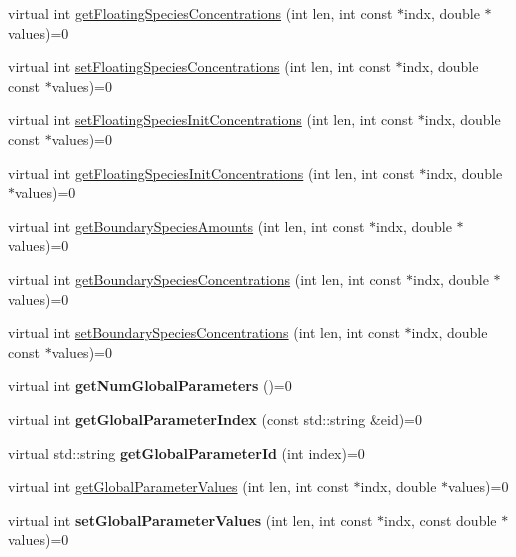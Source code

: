 \begin{DoxyCompactItemize}
\item 
virtual int \hyperlink{classrr_1_1_executable_model_a18aeea833f9db72a6f6beefb0c25f391}{get\-Floating\-Species\-Concentrations} (int len, int const $\ast$indx, double $\ast$values)=0
\item 
virtual int \hyperlink{classrr_1_1_executable_model_a42853a01cc2fae3b4a064d820ebacfaf}{set\-Floating\-Species\-Concentrations} (int len, int const $\ast$indx, double const $\ast$values)=0
\item 
virtual int \hyperlink{classrr_1_1_executable_model_a3a0b495144524d230defee08e58a5150}{set\-Floating\-Species\-Init\-Concentrations} (int len, int const $\ast$indx, double const $\ast$values)=0
\item 
virtual int \hyperlink{classrr_1_1_executable_model_a6521c4bfdb79c0b405a74fc4ccb67309}{get\-Floating\-Species\-Init\-Concentrations} (int len, int const $\ast$indx, double $\ast$values)=0
\item 
virtual int \hyperlink{classrr_1_1_executable_model_a0031c4cc30bf9329fb93f6d99d929669}{get\-Boundary\-Species\-Amounts} (int len, int const $\ast$indx, double $\ast$values)=0
\item 
virtual int \hyperlink{classrr_1_1_executable_model_a20e84c758da51167874aee3c66d8f576}{get\-Boundary\-Species\-Concentrations} (int len, int const $\ast$indx, double $\ast$values)=0
\item 
virtual int \hyperlink{classrr_1_1_executable_model_a4bb73d6d7076400f165335282b77524e}{set\-Boundary\-Species\-Concentrations} (int len, int const $\ast$indx, double const $\ast$values)=0
\item 
\hypertarget{classrr_1_1_executable_model_aabbf6f025ea3c064f0dcaa5e4afaa87e}{virtual int {\bfseries get\-Num\-Global\-Parameters} ()=0}\label{classrr_1_1_executable_model_aabbf6f025ea3c064f0dcaa5e4afaa87e}

\item 
\hypertarget{classrr_1_1_executable_model_abcdcc03c4563dfbe6b64f932812906ee}{virtual int {\bfseries get\-Global\-Parameter\-Index} (const std\-::string \&eid)=0}\label{classrr_1_1_executable_model_abcdcc03c4563dfbe6b64f932812906ee}

\item 
\hypertarget{classrr_1_1_executable_model_a2ad8bcf0faa7848e59e6b7234950dd59}{virtual std\-::string {\bfseries get\-Global\-Parameter\-Id} (int index)=0}\label{classrr_1_1_executable_model_a2ad8bcf0faa7848e59e6b7234950dd59}

\item 
virtual int \hyperlink{classrr_1_1_executable_model_aec13746ffbf2dcbc3467e05a9a73c2e4}{get\-Global\-Parameter\-Values} (int len, int const $\ast$indx, double $\ast$values)=0
\item 
\hypertarget{classrr_1_1_executable_model_a80f25d71380d0eb214601a3136382a35}{virtual int {\bfseries set\-Global\-Parameter\-Values} (int len, int const $\ast$indx, const double $\ast$values)=0}\label{classrr_1_1_executable_model_a80f25d71380d0eb214601a3136382a35}


\end{DoxyCompactItemize}

